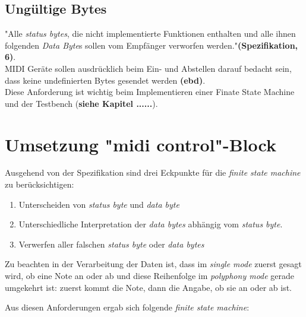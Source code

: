 \subsection{Ungültige Bytes}
"Alle \textit{status bytes}, die nicht implementierte Funktionen enthalten und alle ihnen folgenden \textit{Data Byte}s sollen vom Empfänger verworfen werden."\textbf{(Spezifikation, 6)}.\\ MIDI Geräte sollen ausdrücklich beim Ein- und Abstellen darauf bedacht sein, dass keine undefinierten Bytes gesendet werden \textbf{(ebd)}.\\
Diese Anforderung ist wichtig beim Implementieren einer Finate State Machine und der Testbench (\textbf{siehe Kapitel ......}). \\




\section{Umsetzung "midi control"-Block}\label{sect.midi_umsetzung}
Ausgehend von der Spezifikation sind drei Eckpunkte für die \textit{finite state machine} zu berücksichtigen:\\
\begin{enumerate}
	\item Unterscheiden von \textit{status byte} und \textit{data byte}
	\item Unterschiedliche Interpretation der \textit{data bytes} abhängig vom \textit{status byte}.
	\item Verwerfen aller falschen \textit{status byte} oder \textit{data bytes}
\end{enumerate}

Zu beachten in der Verarbeitung der Daten ist, dass im \textit{single mode} zuerst gesagt wird, ob eine Note an oder ab und diese Reihenfolge im \textit{polyphony mode} gerade umgekehrt ist: zuerst kommt die Note, dann die Angabe, ob sie an oder ab ist.

Aus diesen Anforderungen ergab sich folgende \textit{finite state machine}:

